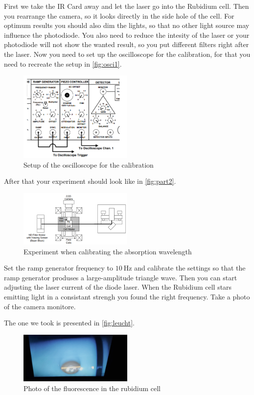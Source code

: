 First we take the IR Card away and let the laser go into the Rubidium cell. 
Then you rearrange the camera, so it looks directly in the side hole of the cell. 
For optimum results you should also dim the lights, so that no other light source may influence the photodiode.
You also need to reduce the intesity of the laser or your photodiode will not show the wanted result, so you put different filters right after the laser.
Now you need to set up the oscilloscope for the calibration, for that you need to recreate the setup in \autoref{fig:osci1}.
\begin{figure}
    \centering
    \includegraphics[width=0.5\textwidth]{images/generator.png}
    \caption{Setup of the oscilloscope for the calibration \cite{V60}}
    \label{fig:osci1}
\end{figure}
After that your experiment should look like in \autoref{fig:part2}.
\begin{figure}
    \centering
    \includegraphics[width=0.5\textwidth]{images/part2.png}
    \caption{Experiment when calibrating the absorption wavelength \cite{V60}}
    \label{fig:part2}
\end{figure}
Set the ramp generator frequency to $\SI{10}{\hertz}$ and calibrate the settings so that the ramp generator produses a large-amplitude triangle wave.
Then you can start adjusting the laser current of the diode laser.
When the Rubidium cell stars emitting light in a consistant strengh you found the right frequency.
Take a photo of the camera monitore.

The one we took is presented in \autoref{fig:leucht}.
\begin{figure}
    \centering
    \includegraphics[width=0.5\textwidth]{images/photo_fluorescence.jpg}
    \caption{Photo of the fluorescence in the rubidium cell}
    \label{fig:leucht}
\end{figure}


